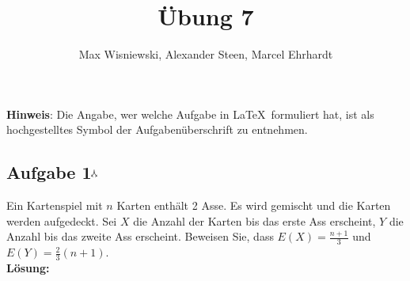 \documentclass[11pt,a4paper,ngerman]{article}
\date{}
\title{Übung 7}
\author{Max Wisniewski\maxw, Alexander Steen\alex, Marcel Ehrhardt\marcel}
\newcommand{\maxw}{$^\curlywedgedownarrow$}
\begin{document}

\renewcommand{\figurename}{Figure}

\maketitle
\thispagestyle{fancy}

\begin{center}
\textbf{Hinweis}: Die Angabe, wer welche Aufgabe in \LaTeX\ formuliert hat, ist als hochgestelltes Symbol der Aufgabenüberschrift zu entnehmen.
\end{center}


\subsection*{Aufgabe 1\maxw}

Ein Kartenspiel mit $n$ Karten enthält 2 Asse. Es wird gemischt und die Karten werden aufgedeckt. Sei $X$ die Anzahl der Karten
bis das erste Ass erscheint, $Y$ die Anzahl bis das zweite Ass erscheint. Beweisen Sie, dass $E(X) = \frac{n+1}{3}$ und $E(Y) = \frac{2}{3}(n+1)$.\\

\textbf{Lösung:}\\
\end{document}
